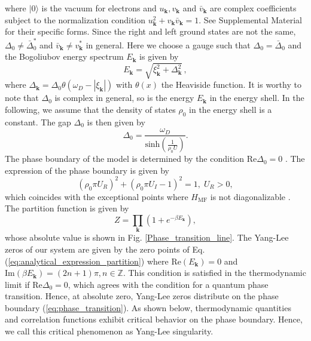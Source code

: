 \documentclass[aps,prl,twocolumn,nofootinbib,superscriptaddress,notitlepage,longbibliography]{revtex4-1}
\begin{document}
	where $|0\rangle$ is the vacuum for electrons and $u_{\bm{k}},v_{\bm{k}}$ and $\bar{v}_{\bm{k}}$ are complex coefficients subject to the normalization condition $u_{\bm{k}}^2+v_{\bm{k}}\bar{v}_{\bm{k}}=1$. See Supplemental Material \cite{SupplementaryMaterial} for their specific forms. Since the right and left ground states are not the same, $\Delta_0\neq \bar{\Delta}_{0}^*$ and $\bar{v}_{\bm{k}}\neq v_{\bm{k}}^*$ in general. Here we choose a gauge such that $\Delta_0=\bar{\Delta}_0$ and the Bogoliubov energy spectrum $E_{\bm{k}}$ is given by \cite{Yamamoto2019}
	\begin{equation}
		E_{\bm{k}}=\sqrt{\xi_{\bm{k}}^2+\Delta_{\bm{k}}^2}\,,
	\end{equation} 
where $\Delta_{\bm{k}}=\Delta_0\theta(\omega_D-|\xi_{\bm{k}}|)$ with $\theta(x)$ the Heaviside function. It is worthy to note that $\Delta_0$ is complex in general, so is the energy $E_{\bm{k}}$ in the energy shell. In the following, we assume that the density of states $\rho_{0}$ in the energy shell is a constant. The gap $\Delta_0$ is then given by 
	\begin{equation}
		\Delta_0 =
		\frac{\omega_D}{\text{sinh} \left( \frac{1}{\rho_0 U}\right)}.\label{eq:gap}
	\end{equation}
	The phase boundary of the model is determined by the condition $\text{Re}\Delta_0=0$ \cite{Yamamoto2019}. The expression of the phase boundary is given by
	\begin{equation}
	(\rho_{0}\pi U_{R})^{2}+(\rho_{0}\pi U_I-1)^{2}=1,\;U_{R}>0,\label{eq:phase_transition}
	\end{equation}
	 which coincides with the exceptional points where $H_{\mathrm{MF}}$ is not diagonalizable \cite{Yamamoto2019}. The partition function is given by
	\begin{equation}
	Z=\prod_{\bm{k}}(1+e^{-\beta E_{\bm{k}}}),\label{eq:analytical_expression_partition}
	\end{equation}
	whose absolute value is shown in Fig. \ref{Phase_transition_line}. 
	The Yang-Lee
	zeros of our system are given by the zero points of Eq. (\ref{eq:analytical_expression_partition}) %
	where $\mathrm{Re}(E_{\bm{k}})=0$
	and $\mathrm{Im}(\beta E_{\bm{k}})=(2n+1)\pi,n\in\mathbb{Z}$. This condition is satisfied in the thermodynamic limit if $\mathrm{Re}\Delta_0=0$, which agrees with the condition for a quantum phase transition. Hence, at absolute zero, Yang-Lee zeros distribute on the phase boundary (\ref{eq:phase_transition}). As shown below, thermodynamic quantities and correlation functions exhibit critical behavior on the phase boundary. Hence, we call this critical phenomenon as Yang-Lee singularity. 
	
\end{document}
